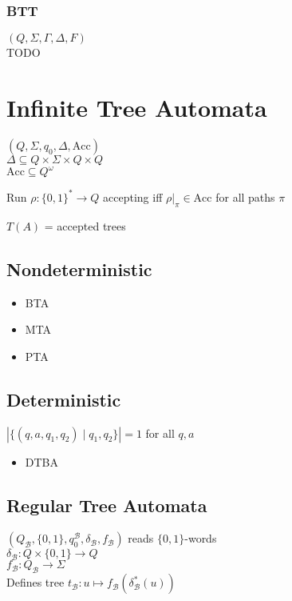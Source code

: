 \documentclass{article}
\begin{document}
\subsubsection*{BTT}
$(Q, \Sigma, \Gamma, \Delta, F)$ \\
TODO %




\newpage
\section{Infinite Tree Automata}
$(Q, \Sigma, q_0, \Delta, \text{Acc})$ \\
$\Delta \subseteq Q \times \Sigma \times Q \times Q$ \\
$\text{Acc} \subseteq Q^\omega$

Run $\rho : \{0,1\}^* \rightarrow Q$ accepting iff $\rho \vert_\pi \in \text{Acc}$ for all paths $\pi$

$T(A)$ = accepted trees

\subsection{Nondeterministic}
\begin{itemize}
	\item BTA
	\item MTA
	\item PTA
\end{itemize}

\subsection{Deterministic}
$| \{ (q, a, q_1, q_2) \mid q_1, q_2 \} | = 1$ for all $q, a$

\begin{itemize}
	\item DTBA
\end{itemize}

\subsection{Regular Tree Automata}
$(Q_\mathcal{B}, \{0, 1\}, q_0^\mathcal{B}, \delta_\mathcal{B}, f_\mathcal{B})$ reads $\{0,1\}$-words \\
$\delta_\mathcal{B} : Q \times \{0, 1\} \rightarrow Q$ \\
$f_\mathcal{B} : Q_\mathcal{B} \rightarrow \Sigma$ \\

Defines tree $t_\mathcal{B} : u \mapsto f_\mathcal{B}(\delta^*_\mathcal{B}(u))$
\end{document}
